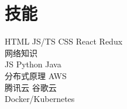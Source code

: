 \documentclass[]{deedy-resume-openfont}
\begin{document}
\begin{minipage}[t]{0.25\textwidth}


\section{技能}
\sectionsep

HTML \textbullet{}JS/TS \textbullet{} CSS \textbullet{} React \textbullet{} Redux \textbullet{}  \\
网络知识 \\
\sectionsep
{}
JS \textbullet{} Python \textbullet{} Java \\
\sectionsep
{}
分布式原理 \textbullet{} AWS \\ 腾讯云 \textbullet{} 谷歌云 \textbullet  \\ Docker/Kubernetes

\sectionsep

%
%

\end{minipage} 
\hfill
\end{document}
